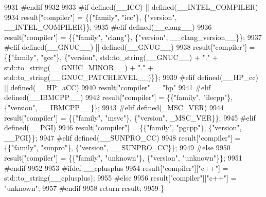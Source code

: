 \begin{DoxyCode}
9931 \textcolor{preprocessor}{#endif}
9932 
9933 \textcolor{preprocessor}{#if defined(\_\_ICC) || defined(\_\_INTEL\_COMPILER)}
9934         result[\textcolor{stringliteral}{"compiler"}] = \{\{\textcolor{stringliteral}{"family"}, \textcolor{stringliteral}{"icc"}\}, \{\textcolor{stringliteral}{"version"}, \_\_INTEL\_COMPILER\}\};
9935 \textcolor{preprocessor}{#elif defined(\_\_clang\_\_)}
9936         result[\textcolor{stringliteral}{"compiler"}] = \{\{\textcolor{stringliteral}{"family"}, \textcolor{stringliteral}{"clang"}\}, \{\textcolor{stringliteral}{"version"}, \_\_clang\_version\_\_\}\};
9937 \textcolor{preprocessor}{#elif defined(\_\_GNUC\_\_) || defined(\_\_GNUG\_\_)}
9938         result[\textcolor{stringliteral}{"compiler"}] = \{\{\textcolor{stringliteral}{"family"}, \textcolor{stringliteral}{"gcc"}\}, \{\textcolor{stringliteral}{"version"}, std::to\_string(\_\_GNUC\_\_) + \textcolor{stringliteral}{"."} + 
      std::to\_string(\_\_GNUC\_MINOR\_\_) + \textcolor{stringliteral}{"."} + std::to\_string(\_\_GNUC\_PATCHLEVEL\_\_)\}\};
9939 \textcolor{preprocessor}{#elif defined(\_\_HP\_cc) || defined(\_\_HP\_aCC)}
9940         result[\textcolor{stringliteral}{"compiler"}] = \textcolor{stringliteral}{"hp"}
9941 \textcolor{preprocessor}{#elif defined(\_\_IBMCPP\_\_)}
9942         result[\textcolor{stringliteral}{"compiler"}] = \{\{\textcolor{stringliteral}{"family"}, \textcolor{stringliteral}{"ilecpp"}\}, \{\textcolor{stringliteral}{"version"}, \_\_IBMCPP\_\_\}\};
9943 \textcolor{preprocessor}{#elif defined(\_MSC\_VER)}
9944         result[\textcolor{stringliteral}{"compiler"}] = \{\{\textcolor{stringliteral}{"family"}, \textcolor{stringliteral}{"msvc"}\}, \{\textcolor{stringliteral}{"version"}, \_MSC\_VER\}\};
9945 \textcolor{preprocessor}{#elif defined(\_\_PGI)}
9946         result[\textcolor{stringliteral}{"compiler"}] = \{\{\textcolor{stringliteral}{"family"}, \textcolor{stringliteral}{"pgcpp"}\}, \{\textcolor{stringliteral}{"version"}, \_\_PGI\}\};
9947 \textcolor{preprocessor}{#elif defined(\_\_SUNPRO\_CC)}
9948         result[\textcolor{stringliteral}{"compiler"}] = \{\{\textcolor{stringliteral}{"family"}, \textcolor{stringliteral}{"sunpro"}\}, \{\textcolor{stringliteral}{"version"}, \_\_SUNPRO\_CC\}\};
9949 \textcolor{preprocessor}{#else}
9950         result[\textcolor{stringliteral}{"compiler"}] = \{\{\textcolor{stringliteral}{"family"}, \textcolor{stringliteral}{"unknown"}\}, \{\textcolor{stringliteral}{"version"}, \textcolor{stringliteral}{"unknown"}\}\};
9951 \textcolor{preprocessor}{#endif}
9952 
9953 \textcolor{preprocessor}{#ifdef \_\_cplusplus}
9954         result[\textcolor{stringliteral}{"compiler"}][\textcolor{stringliteral}{"c++"}] = std::to\_string(\_\_cplusplus);
9955 \textcolor{preprocessor}{#else}
9956         result[\textcolor{stringliteral}{"compiler"}][\textcolor{stringliteral}{"c++"}] = \textcolor{stringliteral}{"unknown"};
9957 \textcolor{preprocessor}{#endif}
9958         \textcolor{keywordflow}{return} result;
9959     \}
\end{DoxyCode}
\mbox{\label{classnlohmann_1_1basic__json_aa13f7c0615867542ce80337cbcf13ada}} 
